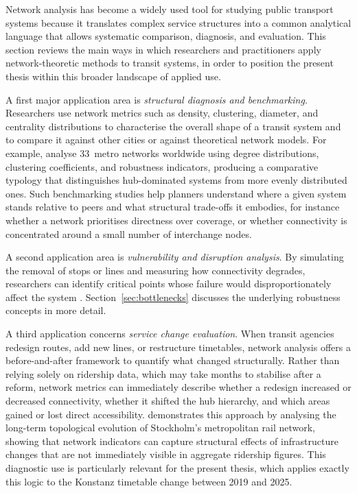 \documentclass[12pt,a4paper,oneside]{report}
\begin{document}
Network analysis has become a widely used tool for studying public transport systems because it translates complex service structures into a common analytical language that allows systematic comparison, diagnosis, and evaluation.
This section reviews the main ways in which researchers and practitioners apply network-theoretic methods to transit systems, in order to position the present thesis within this broader landscape of applied use.

A first major application area is \emph{structural diagnosis and benchmarking}.
Researchers use network metrics such as density, clustering, diameter, and centrality distributions to characterise the overall shape of a transit system and to compare it against other cities or against theoretical network models.
For example, \citet{derrible2010} analyse 33~metro networks worldwide using degree distributions, clustering coefficients, and robustness indicators, producing a comparative typology that distinguishes hub-dominated systems from more evenly distributed ones.
Such benchmarking studies help planners understand where a given system stands relative to peers and what structural trade-offs it embodies, for instance whether a network prioritises directness over coverage, or whether connectivity is concentrated around a small number of interchange nodes.

A second application area is \emph{vulnerability and disruption analysis}.
By simulating the removal of stops or lines and measuring how connectivity degrades, researchers can identify critical points whose failure would disproportionately affect the system \citep{albert2000,derrible2010,cicchini2024}.
Section~\ref{sec:bottlenecks} discusses the underlying robustness concepts in more detail.

A third application concerns \emph{service change evaluation}.
When transit agencies redesign routes, add new lines, or restructure timetables, network analysis offers a before-and-after framework to quantify what changed structurally.
Rather than relying solely on ridership data, which may take months to stabilise after a reform, network metrics can immediately describe whether a redesign increased or decreased connectivity, whether it shifted the hub hierarchy, and which areas gained or lost direct accessibility.
\citet{cats2017} demonstrates this approach by analysing the long-term topological evolution of Stockholm's metropolitan rail network, showing that network indicators can capture structural effects of infrastructure changes that are not immediately visible in aggregate ridership figures.
This diagnostic use is particularly relevant for the present thesis, which applies exactly this logic to the Konstanz timetable change between 2019 and 2025.
\end{document}
